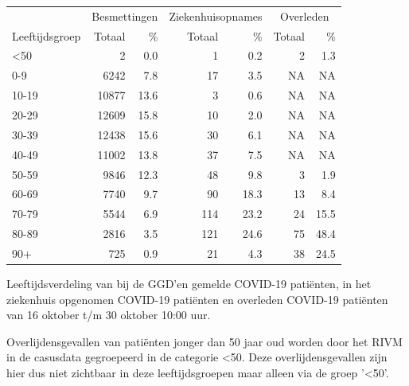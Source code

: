 \documentclass[
  english,
  man,floatsintext]{apa6}
\begin{document}
\begin{table}
\centering\begingroup\fontsize{11}{13}\selectfont

\begin{threeparttable}
\begin{tabular}{lrrrrrr}
\toprule
\multicolumn{1}{c}{ } & \multicolumn{2}{c}{Besmettingen} & \multicolumn{2}{c}{Ziekenhuisopnames} & \multicolumn{2}{c}{Overleden} \\
\cmidrule(l{3pt}r{3pt}){2-3} \cmidrule(l{3pt}r{3pt}){4-5} \cmidrule(l{3pt}r{3pt}){6-7}
Leeftijdsgroep & Totaal & \% & Totaal & \% & Totaal & \%\\
\midrule
<50 & 2 & 0.0 & 1 & 0.2 & 2 & 1.3\\
0-9 & 6242 & 7.8 & 17 & 3.5 & NA & NA\\
10-19 & 10877 & 13.6 & 3 & 0.6 & NA & NA\\
20-29 & 12609 & 15.8 & 10 & 2.0 & NA & NA\\
30-39 & 12438 & 15.6 & 30 & 6.1 & NA & NA\\
40-49 & 11002 & 13.8 & 37 & 7.5 & NA & NA\\
50-59 & 9846 & 12.3 & 48 & 9.8 & 3 & 1.9\\
60-69 & 7740 & 9.7 & 90 & 18.3 & 13 & 8.4\\
70-79 & 5544 & 6.9 & 114 & 23.2 & 24 & 15.5\\
80-89 & 2816 & 3.5 & 121 & 24.6 & 75 & 48.4\\
90+ & 725 & 0.9 & 21 & 4.3 & 38 & 24.5\\
\bottomrule
\end{tabular}
\begin{tablenotes}
\item[1] Leeftijdsverdeling van bij de GGD’en gemelde COVID-19 patiënten, in het ziekenhuis opgenomen COVID-19 patiënten en overleden COVID-19 patiënten van 16 oktober t/m 30 oktober 10:00 uur.
\item[2] Overlijdensgevallen van patiënten jonger dan 50 jaar oud worden door het RIVM in de casusdata gegroepeerd in de categorie <50. Deze overlijdensgevallen zijn hier dus niet zichtbaar in deze leeftijdsgroepen maar alleen via de groep '<50'.
\end{tablenotes}
\end{threeparttable}
\endgroup{}
\end{table}

\newpage
\end{document}

